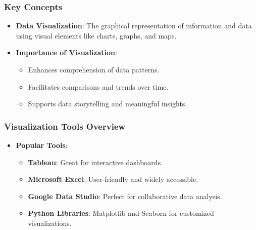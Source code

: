 \documentclass[aspectratio=169]{beamer}
\begin{document}
\begin{frame}[fragile]
    \frametitle{Key Concepts}
    \begin{itemize}
        \item \textbf{Data Visualization}: 
        The graphical representation of information and data using visual elements like charts, graphs, and maps.
        
        \item \textbf{Importance of Visualization}:
        \begin{itemize}
            \item Enhances comprehension of data patterns.
            \item Facilitates comparisons and trends over time.
            \item Supports data storytelling and meaningful insights.
        \end{itemize}
    \end{itemize}
\end{frame}

\begin{frame}[fragile]
    \frametitle{Visualization Tools Overview}
    \begin{itemize}
        \item \textbf{Popular Tools}: 
        \begin{itemize}
            \item \textbf{Tableau}: Great for interactive dashboards.
            \item \textbf{Microsoft Excel}: User-friendly and widely accessible.
            \item \textbf{Google Data Studio}: Perfect for collaborative data analysis.
            \item \textbf{Python Libraries}: Matplotlib and Seaborn for customized visualizations.
        \end{itemize}
    \end{itemize}
\end{frame}
\end{document}
